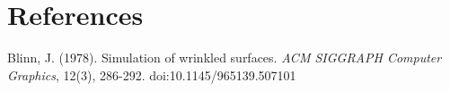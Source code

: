\chapter*{References}

\begin{thebibliography}{13}
  Blinn, J. (1978). Simulation of wrinkled surfaces. \textit{ACM SIGGRAPH 
  Computer Graphics}, 12(3), 286-292. doi:10.1145/965139.507101


\end{thebibliography}

